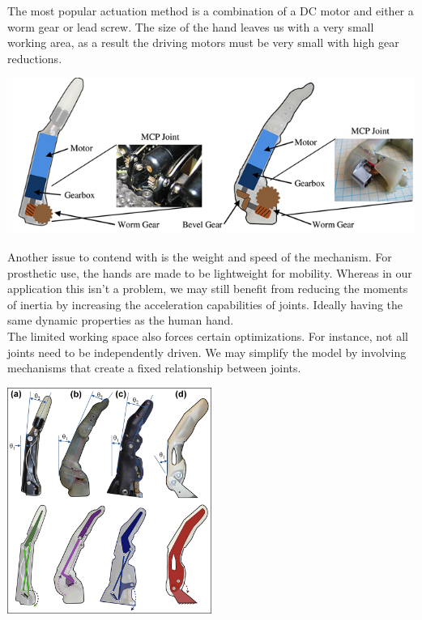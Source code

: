 \documentclass{article}
\begin{document}
The most popular actuation method is a combination of a DC motor and either a worm gear or lead screw. The size of the hand leaves us with a very small working area, as a result the driving motors must be very small with high gear reductions.

\begin{center}
\includegraphics[width=\textwidth]{IMG/fingerMech2.png}
\end{center}

Another issue to contend with is the weight and speed of the mechanism. For prosthetic use, the hands are made to be lightweight for mobility. Whereas in our application this isn't a problem, we may still benefit from reducing the moments of inertia by increasing the acceleration capabilities of joints. Ideally having the same dynamic properties as the human hand.\\

The limited working space also forces certain optimizations. For instance, not all joints need to be independently driven. We may simplify the model by involving mechanisms that create a fixed relationship between joints.

\begin{center}
\includegraphics[width=0.5\textwidth]{IMG/fingerMech.jpg}
\end{center}
\end{document}
